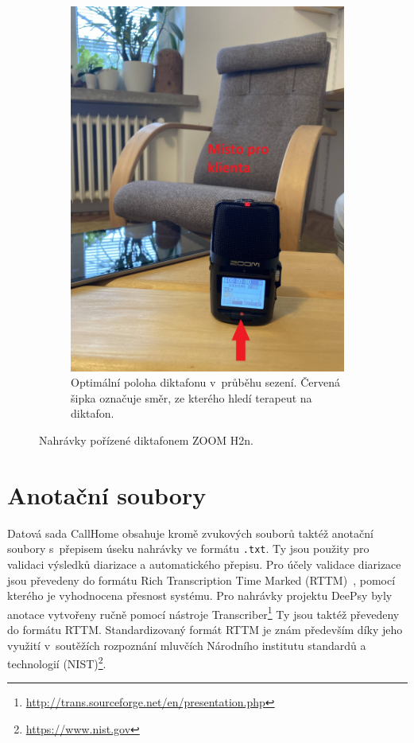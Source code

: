 \begin{figure}[ht]
\begin{subfigure}{0.3\textwidth}
 \includegraphics[width=\linewidth]{obrazky-figures/dictaphone.jpg}    \caption{Optimální poloha diktafonu v~průběhu sezení. Červená šipka označuje směr, ze kterého hledí terapeut na diktafon.}          \label{fig:Dictaphone}
  \end{subfigure}
  \caption{Nahrávky pořízené diktafonem ZOOM H2n.}
\end{figure}


\section{Anotační soubory}
\label{section:Anotation}
Datová sada CallHome obsahuje kromě zvukových souborů taktéž anotační soubory s~přepisem úseku nahrávky ve formátu \texttt{.txt}. Ty jsou použity pro validaci výsledků diarizace a automatického přepisu. Pro účely validace diarizace jsou převedeny do formátu Rich Transcription Time Marked (RTTM)~\cite{Rttm}, pomocí kterého je vyhodnocena přesnost systému. Pro nahrávky projektu DeePsy byly anotace vytvořeny ručně pomocí nástroje Transcriber\footnote{\url{http://trans.sourceforge.net/en/presentation.php}} Ty jsou taktéž převedeny do formátu RTTM. Standardizovaný formát RTTM je znám především díky jeho využití v~soutěžích rozpoznání mluvčích Národního institutu standardů a technologií (NIST)\footnote{\url{https://www.nist.gov}}.

